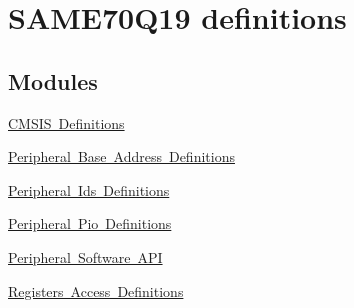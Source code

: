\hypertarget{group__SAME70Q19__definitions}{}\section{S\+A\+M\+E70\+Q19 definitions}
\label{group__SAME70Q19__definitions}
\subsection*{Modules}
\begin{DoxyCompactItemize}
\item 
\mbox{\hyperlink{group__SAME70Q19__cmsis}{C\+M\+S\+I\+S Definitions}}
\item 
\mbox{\hyperlink{group__SAME70Q19__base}{Peripheral Base Address Definitions}}
\item 
\mbox{\hyperlink{group__SAME70Q19__id}{Peripheral Ids Definitions}}
\item 
\mbox{\hyperlink{group__SAME70Q19__pio}{Peripheral Pio Definitions}}
\item 
\mbox{\hyperlink{group__SAME70Q19__api}{Peripheral Software A\+PI}}
\item 
\mbox{\hyperlink{group__SAME70Q19__reg}{Registers Access Definitions}}
\end{DoxyCompactItemize}
